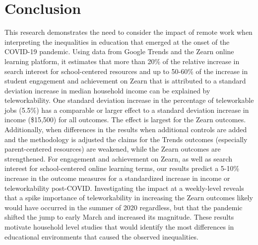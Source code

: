 \section{Conclusion} \label{sec:conclusion}

This research demonstrates the need to consider the impact of remote work when interpreting the inequalities in education that emerged at the onset of the COVID-19 pandemic. Using data from Google Trends and the Zearn online learning platform, it estimates that more than 20\% of the relative increase in search interest for school-centered resources and up to 50-60\% of the increase in student engagement and achievement on Zearn that is attributed to a standard deviation increase in median household income can be explained by teleworkability. One standard deviation increase in the percentage of teleworkable jobs (5.5\%) has a comparable or larger effect to a standard deviation increase in income (\$15,500) for all outcomes. The effect is largest for the Zearn outcomes. Additionally, when differences in the results when additional controls are added and the methodology is adjusted the claims for the Trends outcomes (especially parent-centered resources)  are weakened, while the Zearn outcomes are strengthened. For engagement and achievement on Zearn, as well as search interest for school-centered online learning terms, our results predict a 5-10\% increase in the outcome measures for a standardized increase in income or teleworkability post-COVID. Investigating the impact at a weekly-level reveals that a spike importance of teleworkability in increasing the Zearn outcomes likely would have occurred in the summer of  2020 regardless, but that the pandemic shifted the jump to early March and increased its magnitude. These results motivate household level studies that would identify the most differences in educational environments that caused the observed inequalities.

